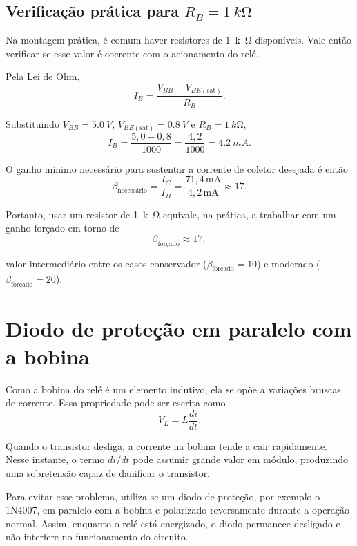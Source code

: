 \documentclass[12pt,a4paper]{article}
\newcommand{\Vbb}{V_{BB}}
\newcommand{\Vbesat}{V_{BE(\mathrm{sat})}}
\newcommand{\Ic}{I_C}
\newcommand{\Ib}{I_B}
\newcommand{\Rb}{R_B}
\newcommand{\betaf}{\beta_{\text{forçado}}}
\newcommand{\betanec}{\beta_{\text{necessário}}}
\begin{document}
\subsection{Verificação prática para $\Rb = \SI{1}{k\ohm}$}

Na montagem prática, é comum haver resistores de \SI{1}{k\ohm} disponíveis. Vale então verificar se esse valor é coerente com o acionamento do relé.

Pela Lei de Ohm,
\begin{equation}
\Ib = \frac{\Vbb - \Vbesat}{\Rb}.
\end{equation}

Substituindo $\Vbb = \SI{5,0}{V}$, $\Vbesat = \SI{0,8}{V}$ e $\Rb = \SI{1}{k\ohm}$,
\begin{equation}
\Ib = \frac{5,0 - 0,8}{1000} = \frac{4,2}{1000} = \SI{4,2}{mA}.
\end{equation}

O ganho mínimo necessário para sustentar a corrente de coletor desejada é então
\begin{equation}
\betanec = \frac{\Ic}{\Ib} = \frac{71,4\,\mathrm{mA}}{4,2\,\mathrm{mA}} \approx 17.
\end{equation}

Portanto, usar um resistor de \SI{1}{k\ohm} equivale, na prática, a trabalhar com um ganho forçado em torno de
\begin{equation}
\boxed{\betaf \approx 17},
\end{equation}

valor intermediário entre os casos conservador ($\betaf = 10$) e moderado ($\betaf = 20$).

\section{Diodo de proteção em paralelo com a bobina}

Como a bobina do relé é um elemento indutivo, ela se opõe a variações bruscas de corrente. Essa propriedade pode ser escrita como
\begin{equation}
V_L = L\frac{di}{dt}.
\end{equation}

Quando o transistor desliga, a corrente na bobina tende a cair rapidamente. Nesse instante, o termo $di/dt$ pode assumir grande valor em módulo, produzindo uma sobretensão capaz de danificar o transistor.

Para evitar esse problema, utiliza-se um diodo de proteção, por exemplo o 1N4007, em paralelo com a bobina e polarizado reversamente durante a operação normal. Assim, enquanto o relé está energizado, o diodo permanece desligado e não interfere no funcionamento do circuito.
\end{document}
